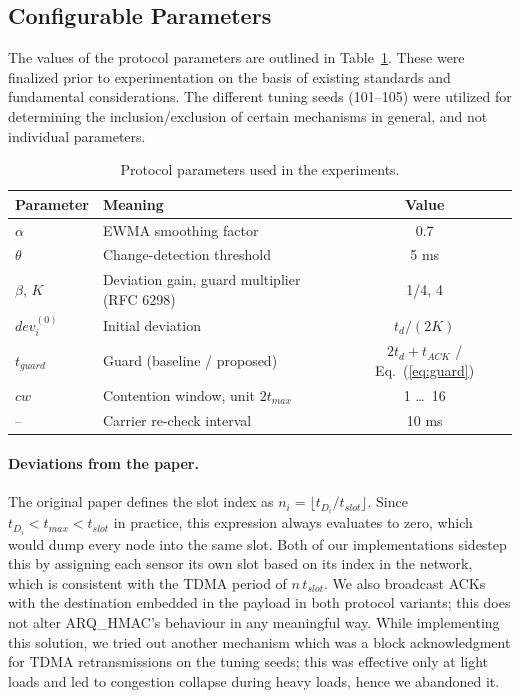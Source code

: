 \documentclass{article}
\begin{document}
\subsection{Configurable Parameters}
The values of the protocol parameters are outlined in Table~\ref{tab:protoparams}. These were finalized prior to experimentation on the basis of existing standards and fundamental considerations. The different tuning seeds (101--105) were utilized for determining the inclusion/exclusion of certain mechanisms in general, and not individual parameters.

\begin{table}[H]
\centering
\caption{Protocol parameters used in the experiments.}
\label{tab:protoparams}
\small
{}
\begin{tabular}{@{}llc@{}}
\toprule
\textbf{Parameter} & \textbf{Meaning} & \textbf{Value} \\
\midrule
$\alpha$ & EWMA smoothing factor & 0.7 \\
$\theta$ & Change-detection threshold & 5 ms \\
$\beta$, $K$ & Deviation gain, guard multiplier (RFC 6298) & 1/4, 4 \\
$dev_i^{(0)}$ & Initial deviation & $t_d/(2K)$ \\
$t_{guard}$ & Guard (baseline / proposed) & $2t_d + t_{ACK}$ / Eq.~(\ref{eq:guard}) \\
$cw$ & Contention window, unit $2t_{max}$ & 1 \ldots\ 16 \\
-- & Carrier re-check interval & 10 ms \\
\bottomrule
\end{tabular}
\end{table}

\paragraph{Deviations from the paper.} The original paper defines the slot index as $n_i = \lfloor t_{D_i} / t_{slot} \rfloor$. Since $t_{D_i} < t_{max} < t_{slot}$ in practice, this expression always evaluates to zero, which would dump every node into the same slot. Both of our implementations sidestep this by assigning each sensor its own slot based on its index in the network, which is consistent with the TDMA period of $n\,t_{slot}$. We also broadcast ACKs with the destination embedded in the payload in both protocol variants; this does not alter ARQ\_HMAC's behaviour in any meaningful way. While implementing this solution, we tried out another mechanism which was a block acknowledgment for TDMA retransmissions on the tuning seeds; this was effective only at light loads and led to congestion collapse during heavy loads, hence we abandoned it.
\end{document}
